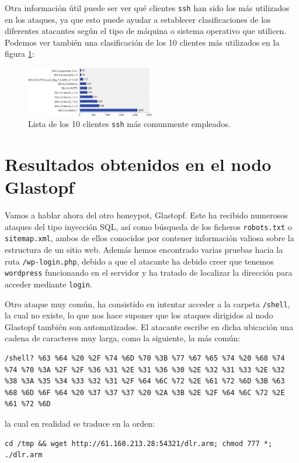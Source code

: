 \documentclass[journal]{IEEEtran}
\begin{document}
Otra información útil puede ser ver qué clientes {\tt ssh} han sido los más utilizados en los ataques, ya que esto puede ayudar a establecer clasificaciones de los diferentes atacantes según el tipo de máquina o sistema operativo que utilicen. Podemos ver también una clasificación de los 10 clientes más utilizados en la figura \ref{fig:ssh}:

\begin{figure}
\centering
\includegraphics[width=0.5\textwidth]{img/ssh}
\caption{Lista de los 10 clientes {\tt ssh} más comunmente empleados.}
\label{fig:ssh}
\end{figure}


\section{Resultados obtenidos en el nodo Glastopf}

Vamos a hablar ahora del otro honeypot, Glastopf. Este ha recibido numerosos ataques del tipo inyección SQL, así como búsqueda de los ficheros {\tt robots.txt} o {\tt sitemap.xml}, ambos de ellos conocidos por contener información valiosa sobre la estructura de un sitio web. Además hemos encontrado varias pruebas hacia la ruta {\tt /wp-login.php}, debido a que el atacante ha debido creer que tenemos {\tt wordpress} funcionando en el servidor y ha tratado de localizar la dirección para acceder mediante {\tt login}.

Otro ataque muy común, ha consistido en intentar acceder a la carpeta {\tt /shell}, la cual no existe, lo que nos hace suponer que los ataques dirigidos al nodo Glastopf también son automatizados. El atacante escribe en dicha ubicación una cadena de caracteres muy larga, como la siguiente, la más común:

\begin{lstlisting}
/shell? %63 %64 %20 %2F %74 %6D %70 %3B %77 %67 %65 %74 %20 %68 %74 %74 %70 %3A %2F %2F %36 %31 %2E %31 %36 %30 %2E %32 %31 %33 %2E %32 %38 %3A %35 %34 %33 %32 %31 %2F %64 %6C %72 %2E %61 %72 %6D %3B %63 %68 %6D %6F %64 %20 %37 %37 %37 %20 %2A %3B %2E %2F %64 %6C %72 %2E %61 %72 %6D
\end{lstlisting}
la cual en realidad se traduce en la orden:
\lstset{basicstyle=\small\ttfamily, breaklines=true}
\begin{lstlisting}
cd /tmp && wget http://61.160.213.28:54321/dlr.arm; chmod 777 *; ./dlr.arm
\end{lstlisting}
\end{document}
